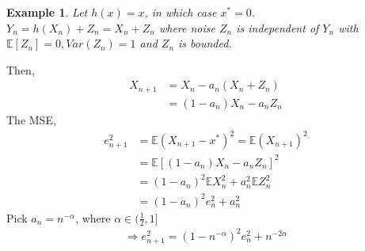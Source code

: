 \documentclass[11pt,a4paper]{article}
\newtheorem{example}{Example}
\begin{document}
\begin{example}
    Let $h(x) = x$, in which case $x^* = 0$. $Y_n=h(X_n)+Z_n=X_n+Z_n$ where noise $Z_n$ is independent of $Y_n$ with $\mathbb{E}[Z_n]=0,Var(Z_n)=1$ and $Z_n$ is bounded.
\end{example}
Then,
    \begin{equation}
        \begin{aligned}
            X_{n+1}&=X_n-a_n(X_n+Z_n)\\
            &=(1-a_n)X_n-a_n Z_n
        \end{aligned}
        \nonumber
    \end{equation}
The MSE,
\begin{equation}
    \begin{aligned}
        e_{n+1}^2&=\mathbb{E}(X_{n+1}-x^*)^2=\mathbb{E}(X_{n+1})^2\\
        &=\mathbb{E}[(1-a_n)X_n-a_n Z_n]^2\\
        &=(1-a_n)^2\mathbb{E}X_n^2+a_n^2\mathbb{E}Z_n^2\\
        &=(1-a_n)^2e_n^2+a_n^2
    \end{aligned}
    \nonumber
\end{equation}
Pick $a_n=n^{-\alpha}$, where $\alpha\in (\frac{1}{2},1]$
\begin{equation}
    \begin{aligned}
        \Rightarrow e_{n+1}^2=(1-n^{-\alpha})^2e_n^2+n^{-2\alpha}
    \end{aligned}
    \nonumber
\end{equation}
\end{document}

